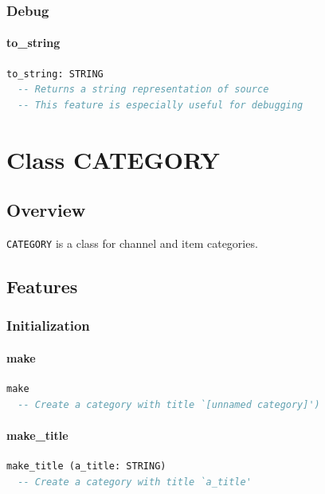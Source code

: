 \subsection{Debug}
\label{sec:item-source-debug}

\subsubsection{to\_string}

\begin{lstlisting}[language=Eiffel]
to_string: STRING
  -- Returns a string representation of source
  -- This feature is especially useful for debugging
\end{lstlisting}


\chapter{Class CATEGORY}
\label{sec:feed-category}


\section{Overview}
\label{sec:feed-category-overview}

\texttt{CATEGORY} is a class for channel and item categories.


\section{Features}
\label{sec:feed-category-features}

\subsection{Initialization}
\label{sec:category-initialization}

\subsubsection{make}

\begin{lstlisting}[language=Eiffel]
make
  -- Create a category with title `[unnamed category]')
\end{lstlisting}

\subsubsection{make\_title}

\begin{lstlisting}[language=Eiffel]
make_title (a_title: STRING)
  -- Create a category with title `a_title'
\end{lstlisting}

